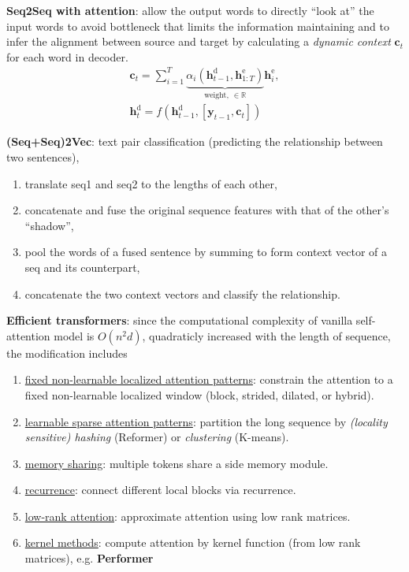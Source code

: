 \textbf{Seq2Seq with attention}: allow the output words to directly ``look at'' the input words to avoid bottleneck that limits the information maintaining and to infer the alignment between source and target by calculating a \textit{dynamic context} $\bm{c}_t$ for each word in decoder.
\begin{gather}
    \bm{c}_t=\sum_{i=1}^T\underbrace{\alpha_i(\bm{h}_{t-1}^\mathrm{d},\bm{h}_{1:T}^\mathrm{e})}_{\text{weight},~\in\mathbb{R}}\bm{h}_i^\mathrm{e},\\
    \bm{h}_t^\mathrm{d}=f(\bm{h}_{t-1}^\mathrm{d},[\bm{y}_{t-1},\bm{c}_t])
\end{gather}

\textbf{(Seq+Seq)2Vec}: text pair classification (predicting the relationship between two sentences), 
\begin{enumerate}[{(i)}]
    \item translate seq1 and seq2 to the lengths of each other, 
    \item concatenate and fuse the original sequence features with that of the other's ``shadow'',
    \item pool the words of a fused sentence by summing to form context vector of a seq and its counterpart,
    \item concatenate the two context vectors and classify the relationship.
\end{enumerate}




\textbf{Efficient transformers}: 
since the computational complexity of vanilla self-attention model is $O(n^2d)$, 
quadraticly increased with the length of sequence, the modification includes
\begin{enumerate}[{(1)}]
    \item \uline{fixed non-learnable localized attention patterns}: constrain the attention to a fixed non-learnable localized window (block, strided, dilated, or hybrid).
    \item \uline{learnable sparse attention patterns}: partition the long sequence by \textit{(locality sensitive) hashing} (Reformer) or \textit{clustering} (K-means).
    \item \uline{memory sharing}: multiple tokens share a side memory module.
    \item \uline{recurrence}: connect different local blocks via recurrence.
    \item \uline{low-rank attention}: approximate attention using low rank matrices.
    \item \uline{kernel methods}: compute attention by kernel function (from low rank matrices), e.g. \textbf{Performer}
\end{enumerate}


